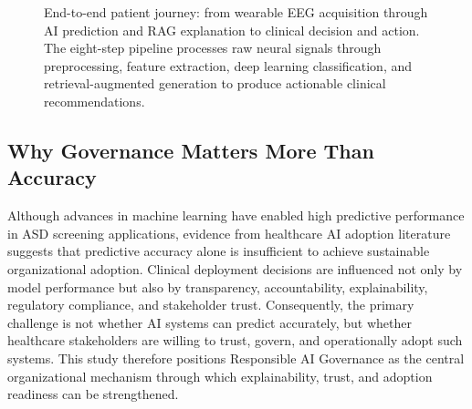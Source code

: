 \begin{figure}[!htbp]
{%
}
\caption[End-to-end patient journey]{End-to-end patient journey: from wearable EEG acquisition through AI prediction and RAG explanation to clinical decision and action. The eight-step pipeline processes raw neural signals through preprocessing, feature extraction, deep learning classification, and retrieval-augmented generation to produce actionable clinical recommendations.}
\label{fig:patient_journey}
\end{figure}

\subsection{Why Governance Matters More Than Accuracy}
\label{sec:why_governance_over_accuracy}

\noindent Although advances in machine learning have enabled high predictive performance in ASD screening applications, evidence from healthcare AI adoption literature suggests that predictive accuracy alone is insufficient to achieve sustainable organizational adoption. Clinical deployment decisions are influenced not only by model performance but also by transparency, accountability, explainability, regulatory compliance, and stakeholder trust. Consequently, the primary challenge is not whether AI systems can predict accurately, but whether healthcare stakeholders are willing to trust, govern, and operationally adopt such systems. This study therefore positions Responsible AI Governance as the central organizational mechanism through which explainability, trust, and adoption readiness can be strengthened.


